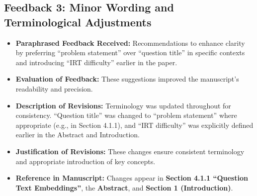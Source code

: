 \documentclass[
    a4paper, %
    10pt, %
    twoside, %
]{LTJournalArticle}
\begin{document}
\subsection*{Feedback 3: Minor Wording and Terminological Adjustments}
\begin{itemize}
    \item \textbf{Paraphrased Feedback Received:} Recommendations to enhance clarity by preferring ``problem statement'' over ``question title'' in specific contexts and introducing ``IRT difficulty'' earlier in the paper.
    \item \textbf{Evaluation of Feedback:} These suggestions improved the manuscript's readability and precision.
    \item \textbf{Description of Revisions:} Terminology was updated throughout for consistency. ``Question title'' was changed to ``problem statement'' where appropriate (e.g., in Section 4.1.1), and ``IRT difficulty'' was explicitly defined earlier in the Abstract and Introduction.
    \item \textbf{Justification of Revisions:} These changes ensure consistent terminology and appropriate introduction of key concepts.
    \item \textbf{Reference in Manuscript:} Changes appear in \textbf{Section 4.1.1 ``Question Text Embeddings''}, the \textbf{Abstract}, and \textbf{Section 1 (Introduction)}.
\end{itemize}
\end{document}
